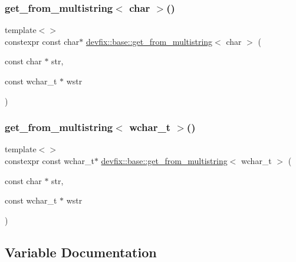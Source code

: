 \mbox{\label{namespacedevfix_1_1base_a1d6f6a1a767fa54cd6ff94ae14b43e90}} 
\subsubsection{\texorpdfstring{get\+\_\+from\+\_\+multistring$<$ char $>$()}{get\_from\_multistring< char >()}}
{\footnotesize\ttfamily template$<$$>$ \\
constexpr const char$\ast$ \hyperlink{namespacedevfix_1_1base_a84282bc5458412dfed5ce8b039a70519}{devfix\+::base\+::get\+\_\+from\+\_\+multistring}$<$ char $>$ (\begin{DoxyParamCaption}\item[{const char $\ast$}]{str,  }\item[{const wchar\+\_\+t $\ast$}]{wstr }\end{DoxyParamCaption})}

\mbox{\label{namespacedevfix_1_1base_a100ea64654a747f262206d9e4b31e6f2}} 
\subsubsection{\texorpdfstring{get\+\_\+from\+\_\+multistring$<$ wchar\+\_\+t $>$()}{get\_from\_multistring< wchar\_t >()}}
{\footnotesize\ttfamily template$<$$>$ \\
constexpr const wchar\+\_\+t$\ast$ \hyperlink{namespacedevfix_1_1base_a84282bc5458412dfed5ce8b039a70519}{devfix\+::base\+::get\+\_\+from\+\_\+multistring}$<$ wchar\+\_\+t $>$ (\begin{DoxyParamCaption}\item[{const char $\ast$}]{str,  }\item[{const wchar\+\_\+t $\ast$}]{wstr }\end{DoxyParamCaption})}



\subsection{Variable Documentation}
\mbox{\label{namespacedevfix_1_1base_a875309a22b6e69dd0e2340814fb44973}} 

